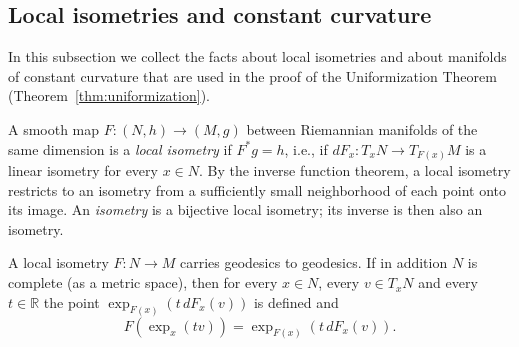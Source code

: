 \subsection{Local isometries and constant curvature}

In this subsection we collect the facts about local isometries and
about manifolds of constant curvature that are used in the proof of
the Uniformization Theorem (Theorem~\ref{thm:uniformization}).

\begin{definition}
\label{def:local-isometry}
\leanok

A smooth map $F\colon (N,h)\to (M,g)$ between Riemannian manifolds
of the same dimension is a {\sl local isometry} if $F^*g=h$, i.e.,
if $dF_x\colon T_xN\to T_{F(x)}M$ is a linear isometry for every
$x\in N$. By the inverse function theorem, a local isometry
restricts to an isometry from a sufficiently small neighborhood of
each point onto its image. An {\sl isometry} is a bijective local
isometry; its inverse is then also an isometry.
\end{definition}

\begin{lemma}
\label{lem:local-isometry-exponential}
\leanok

A local isometry $F\colon N\to M$ carries geodesics to geodesics.
If in addition $N$ is complete (as a metric space), then for every
$x\in N$, every $v\in T_xN$ and every $t\in \mathbb{R}$ the point
$\exp_{F(x)}\left(t\,dF_x(v)\right)$ is defined and
$$F\left(\exp_x(tv)\right)=\exp_{F(x)}\left(t\,dF_x(v)\right).$$
\end{lemma}

